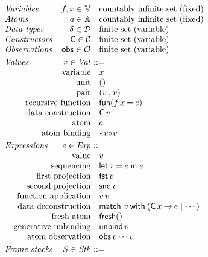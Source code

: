\documentclass{LMCS}
\theoremstyle{plain}
\theoremstyle{definition}
\newcommand{\ALT}{\mathrel{\kw{|}}}
\newcommand{\atm}[1][a]{#1}
\newcommand{\Atom}{\mathbb{A}}
\newcommand{\BINDVAL}[2]{\mathopen{\text{\normalfont\guillemotleft}}#1
  \mathclose{\text{\normalfont\guillemotright}}#2}
\newcommand{\CON}[1][C]{\kw{#1}}
\newcommand{\Con}{\mathcal{C}}
\newcommand{\dty}{\delta}
\newcommand{\Dty}{\mathcal{D}}
\newcommand{\EQ}{\mathbin{\kw{=}}}
\renewcommand{\exp}[1][e]{#1}
\newcommand{\Exp}{\mathit{Exp}}
\newcommand{\FRESH}{\kw{fresh}}
\newcommand{\FST}{\kw{fst}}
\newcommand{\FUN}{\kw{fun}}
\newcommand{\IN}{\mathrel{\kw{in}}}
\newcommand{\LET}{\mathop{\kw{let}}}
\newcommand{\LP}{\mathopen{\kw{(}}}
\newcommand{\kw}[1]{\mathsf{#1}}
\newcommand{\MATCH}{\kw{match}}
\newcommand{\Obs}{\mathcal{O}}
\newcommand{\OBS}[1][obs]{\kw{#1}}
\newcommand{\RP}{\mathclose{\kw{)}}}
\newcommand{\stk}[1][S]{#1}
\newcommand{\Stk}{\mathit{Stk}}
\newcommand{\TO}{\mathbin{\rightarrow}}
\newcommand{\UNBIND}{\kw{unbind}}
\newcommand{\UNITVAL}{\LP\RP}
\newcommand{\val}[1][v]{#1}
\newcommand{\Val}{\mathit{Val}}
\newcommand{\vid}[1][x]{#1}
\newcommand{\Vid}{\mathbb{V}}
\newcommand{\WITH}{\mathbin{\kw{with}}}
\begin{document}
\begin{figure}\small
  \centering
  \[
  \begin{array}{lrl}
    \text{\emph{Variables}} 
    &\vid[f],\vid\in\Vid &\text{countably infinite set (fixed)}\\
    \text{\emph{Atoms}}  
    &\atm\in\Atom &\text{countably infinite set (fixed)}\\
    \text{\emph{Data types}} 
    &\dty\in\Dty &\text{finite set (variable)}\\
    \text{\emph{Constructors}} 
    &\CON\in\Con &\text{finite set (variable)}\\
    \text{\emph{Observations}} 
    &\OBS\in\Obs  &\text{finite set (variable)}\\[\jot]
    \text{\emph{Values}} 
    &\val\in\Val &\!\!\!\!::=\\
    &\makebox[0pt][r]{variable} &\vid\\
    &\makebox[0pt][r]{unit} &\UNITVAL\\
    &\makebox[0pt][r]{pair} &\PAIR{\val}{\val}\\
    &\makebox[0pt][r]{recursive function} &\FUN(\vid[f]\,\vid\EQ \exp)\\
    &\makebox[0pt][r]{data construction} &\CON\,\val\\
    &\makebox[0pt][r]{atom} &\atm\\
    &\makebox[0pt][r]{atom binding} &\BINDVAL{\val}{\val}\\[\jot]
    \text{\emph{Expressions}}
    &\exp\in\Exp &\!\!\!\!::=\\
    &\makebox[0pt][r]{value} &\val\\
    &\makebox[0pt][r]{sequencing} &\LET {\vid\EQ\exp} \IN \exp\\
    &\makebox[0pt][r]{first projection} &\FST\,\val\\
    &\makebox[0pt][r]{second projection} &\SND\,\val\\
    &\makebox[0pt][r]{function application} &\val\,\val\\
    &\makebox[0pt][r]{data deconstruction} 
    &\MATCH\  \val \WITH ({\CON\,\vid\TO\exp}\ALT\cdots)\\
    &\makebox[0pt][r]{fresh atom} &\FRESH\UNITVAL\\
    &\makebox[0pt][r]{generative unbinding} &\UNBIND\,\val\\
    &\makebox[0pt][r]{atom observation} &\OBS\,\val\cdots\val\\[\jot]
    \text{\emph{Frame stacks}} 
    &\stk\in\Stk &\!\!\!\!::=\\

\end{array}\]
\end{figure}
\end{document}
